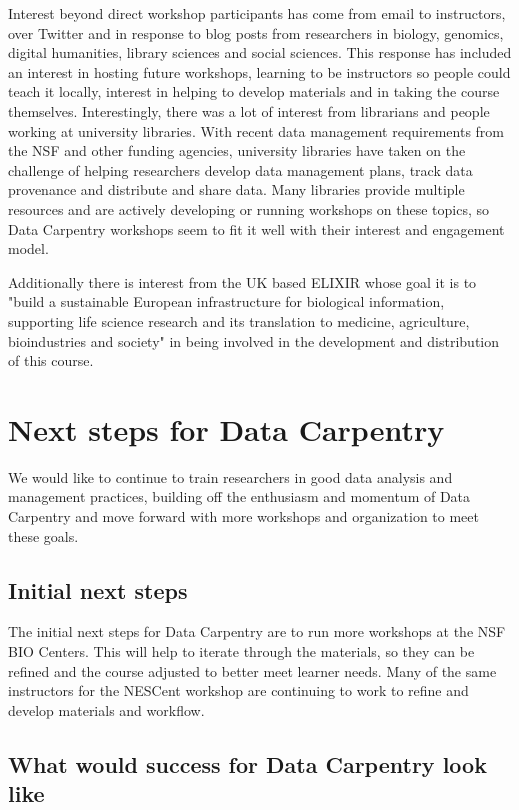 \documentclass[11pt]{article}
\begin{document}
Interest beyond direct workshop participants has come from email to instructors, over Twitter and in response to blog posts from researchers in biology, genomics, digital humanities, library sciences and social sciences.
This response has 
included an interest in hosting future workshops, learning to be 
instructors so people could teach it locally, interest in helping to develop materials and in taking the course themselves.
Interestingly, there was a lot of interest from librarians and people working at university libraries. With recent data management requirements from the NSF and other funding agencies, university libraries have
taken on the challenge of helping researchers develop data management plans, track data provenance and 
distribute and share data. Many libraries provide multiple resources and are actively developing or running workshops
on these topics, so Data Carpentry workshops seem to fit it well with their interest and engagement model.

Additionally there is interest from the UK based ELIXIR whose goal it is to "build a sustainable European infrastructure for biological information, supporting life science research and its translation to medicine, agriculture, bioindustries and society" in being involved in the development and distribution of this course. 

\section{Next steps for Data Carpentry}

We would like to continue to train researchers in good data analysis and management practices, building off the enthusiasm and momentum of Data Carpentry and move forward with more workshops and organization to meet 
these goals.

\subsection{Initial next steps}

The initial next steps for Data Carpentry are to run more workshops at the NSF BIO Centers. This will help to 
iterate through the materials, so they can be refined and the course adjusted to better meet learner needs. Many of the same instructors for the NESCent workshop are continuing to work to refine and develop materials and workflow.

\subsection{What would success for Data Carpentry look like}
\end{document}

